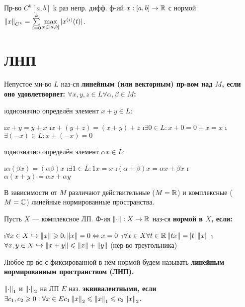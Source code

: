 \begin{defn}
Пр-во $C^k[a, b]$ k раз непр. дифф. ф-ий $x:[a, b] \rightarrow \mathbb{R}$ с нормой $\left\lVert x\right\rVert_{C^k} = \sum\limits_{i=0}^k \max\limits_{x \in [a, b]} |x^{(i)}(t)|$.
\end{defn}

\section{ЛНП}

\begin{defn}
Непустое мн-во $L$ наз-ся \bf{линейным} (или \bf{векторным}) пр-вом над $M$, если оно удовлетворяет:
$\forall x, y, z \in L \forall \alpha, \beta \in M$:
\begin{enumerate}
\i однозначно определён элемент $x+y \in L$:
 \begin{enumerate}
 \i $x+y = y+x$
 \i $x+(y+z) = (x+y)+z$
 \i $\exists 0 \in L: x+0 = 0+x = x$
 \i $\exists (-x) \in L: x+(-x) = 0$
 \end{enumerate}
\i однозначно определён элемент $\alpha x \in L$:
 \begin{enumerate}
 \i $\alpha(\beta x) = (\alpha \beta)x$
 \i $\exists 1 \in L: 1x=x$
 \i $(\alpha+\beta)x = \alpha x + \beta x$
 \i $\alpha(x+y) = \alpha x + \alpha y$
 \end{enumerate}
\end{enumerate}
В зависимости от $M$ различают действительные ($M=\mathbb{R}$) и комплексные ($M=\mathbb{C}$) линейные нормированные пространства.
\end{defn}

\begin{defn}
Пусть $X$ --- комплексное ЛП. Ф-ия $\left\lVert\cdot\right\rVert: X \rightarrow \mathbb{R}$ наз-ся \bf{нормой} в $X$, если:
\begin{enumerate}
\i $\forall x \in X \hookrightarrow \left\lVert x\right\rVert \geqslant 0, \left\lVert x\right\rVert = 0 \Leftrightarrow x = 0$
\i $\forall x \in X \forall t \in \mathbb{R} \left\lVert tx\right\rVert = |t| \left\lVert x\right\rVert$
\i $\forall x, y \in X \hookrightarrow \left\lVert x+y\right\rVert \leqslant \left\lVert x\right\rVert + \left\lVert y\right\rVert$ (нер-во треугольника)
\end{enumerate}
Любое пр-во с фиксированной в нём нормой будем называть \bf{линейным нормированным пространством (ЛНП)}.
\end{defn}

\begin{defn}
$\left\lVert\cdot\right\rVert_1$ и $\left\lVert\cdot\right\rVert_2$ на ЛП $E$ наз. \bf{эквивалентными}, если $\exists c_1, c_2 \geqslant 0: \forall x \in E c_1 \left\lVert x\right\rVert_2 \leqslant \left\lVert x\right\rVert_1 \leqslant c_2 \left\lVert x\right\rVert_2$.
\end{defn}


